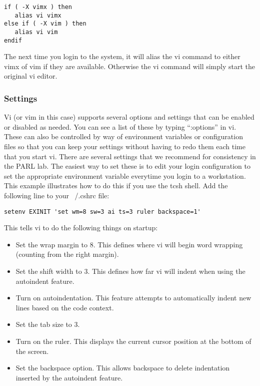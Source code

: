 \documentclass[11pt, letterpaper]{article}
\begin{document}
\begin{verbatim}
if ( -X vimx ) then
   alias vi vimx
else if ( -X vim ) then
   alias vi vim
endif
\end{verbatim}

The next time you login to the system, it will alias the vi command
to either vimx of vim if they are available.  Otherwise the vi command will simply
start the original vi editor.

\subsubsection{Settings}

\label{sec:vi_env}
Vi (or vim in this case) supports several options and settings that can be enabled or
disabled as needed.  You can see a list of these by typing ``:options'' in
vi.  These can also be controlled by way of environment variables or
configuration files so that you can keep your settings without having to
redo them each time that you start vi.  There are several settings that
we recommend for consistency in the PARL lab.  The easiest way to set
these is to edit your login configuration to set the appropriate
environment variable everytime you login to a workstation.  This example
illustrates how to do this if you use the tcsh shell.  Add the following
line to your ~/.cshrc file:

\begin{verbatim}
setenv EXINIT 'set wm=8 sw=3 ai ts=3 ruler backspace=1'
\end{verbatim}

This tells vi to do the following things on startup:
\begin{itemize}
\item Set the wrap margin to 8.  This defines where vi will begin word
wrapping (counting from the right margin).
\item Set the shift width to 3.  This defines how far vi will indent
when using the autoindent feature.
\item Turn on autoindentation.  This feature attempts to automatically
indent new lines based on the code context.
\item Set the tab size to 3.  
\item Turn on the ruler.  This displays the current cursor position at
the bottom of the screen.
\item Set the backspace option.  This allows backspace to delete
indentation inserted by the autoindent feature.
\end{itemize}
\end{document}
